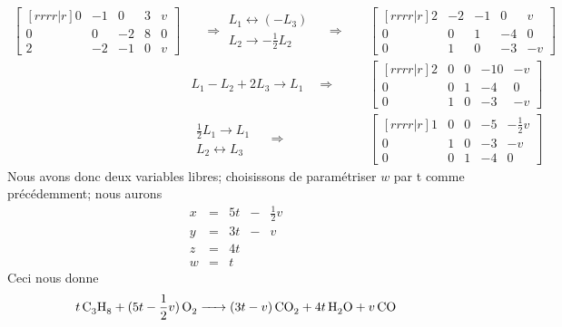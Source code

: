 \[
\begin{matrix}
\begin{bmatrix}[rrrr|r]
0 & -1 & 0 & 3 & v \\
0 & 0  & -2 & 8 & 0 \\
2 & -2 & -1 & 0 & v
\end{bmatrix}
& \quad\Rightarrow
\begin{matrix}
L_1 \leftrightarrow (-L_3) \\
L_2 \rightarrow -\frac12 L_2
\end{matrix}
\quad\Rightarrow\quad&
\begin{bmatrix}[rrrr|r]
2 & -2 & -1 & 0 & v\\
0 & 0  & 1 & -4 & 0 \\
0 & 1 & 0 & -3 & -v
\end{bmatrix} \\
&
L_1 - L_2 +2L_3\rightarrow L_1 
\quad\Rightarrow\quad&
\begin{bmatrix}[rrrr|r]
2 & 0 & 0 & -10 & -v\\
0 & 0  & 1 & -4 & 0 \\
0 & 1 & 0 & -3 & -v
\end{bmatrix} \\
&\begin{matrix}
\frac12 L_1 \rightarrow L_1 \\
L_2 \leftrightarrow L_3
\end{matrix} \quad\Rightarrow\quad &
\begin{bmatrix}[rrrr|r]
1 & 0 & 0 & -5 & -\frac12 v\\
0 & 1  & 0 & -3 & -v \\
0 & 0 & 1 & -4 & 0
\end{bmatrix}
\end{matrix}
\]
Nous avons donc deux variables libres; choisissons de paramétriser $w$ par t
comme précédemment; nous aurons
\[
\begin{matrix}
x &=& 5t &-&\frac12 v\\
y &=& 3t &-&v\\
z &=& 4t \\
w &=& t
\end{matrix}
\]
Ceci nous donne
\[
\ce{$t\,$C3H8 + $(5t-\frac{1}{2}v)\,$O2 -> $(3t-v)\,$CO2 + $4t\,$H2O + $v\,$CO}
\]

